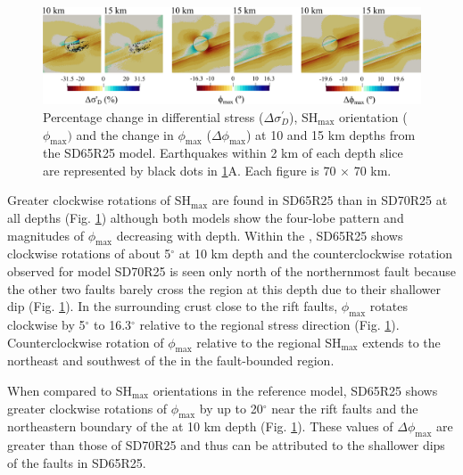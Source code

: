 \documentclass[draft]{agujournal2018}
\begin{document}
\begin{figure}[ht]
\centering
\includegraphics[width=30pc]{Figures/SD65R25_2.png}
\caption{Percentage change in differential stress ($\Delta\sigma_{D}^{\prime}$), SH$_{\max}$ orientation ($\phi_{\max})$ and the change in $\phi_{\max}$ ($\Delta\phi_{\max}$) at 10 and 15 km depths from the SD65R25 model. Earthquakes within 2 km of each depth slice are represented by black dots in \ref{fig:eff_of_dips}A.  Each figure is 70 $\times$ 70 km.}
\label{fig:eff_of_dips}
\end{figure}

Greater clockwise rotations of SH$_{\max}$ are found in SD65R25 than in SD70R25 at all depths (Fig. \ref{fig:eff_of_dips}) although both models show the four-lobe pattern and magnitudes of $\phi_{\max}$ decreasing with depth. Within the , SD65R25 shows clockwise rotations of about 5$^\circ$ at 10 km depth and the counterclockwise rotation observed for model SD70R25 is seen only north of the northernmost fault because the other two faults barely cross the  region at this depth due to their shallower dip (Fig. \ref{fig:eff_of_dips}). In the surrounding crust close to the rift faults, $\phi_{\max}$ rotates clockwise by 5$^\circ$ to 16.3$^\circ$ relative to the regional stress direction (Fig. \ref{fig:eff_of_dips}). Counterclockwise rotation of $\phi_{\max}$ relative to the regional SH$_{\max}$ extends to the northeast and southwest of the  in the fault-bounded region.

When compared to SH$_{\max}$ orientations in the reference model, SD65R25 shows greater clockwise rotations of $\phi_{\max}$ by up to 20$^\circ$ near the rift faults and the northeastern boundary of the  at 10 km depth (Fig. \ref{fig:eff_of_dips}). These values of $\Delta \phi_{\max}$ are greater than those of SD70R25 and thus can be attributed to the shallower dips of the faults in SD65R25.
\end{document}
